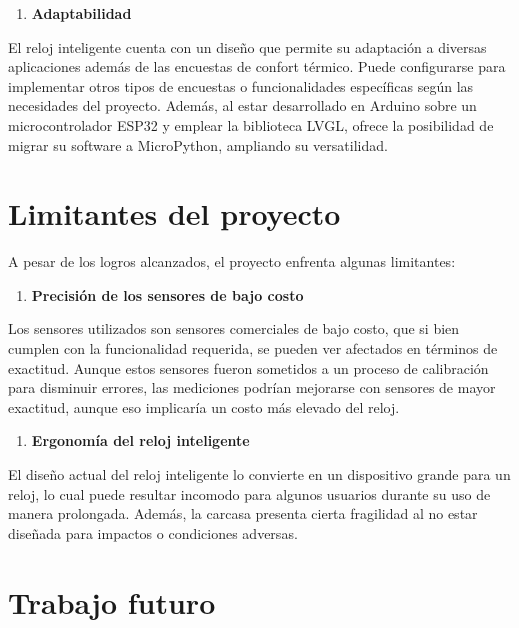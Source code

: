 \documentclass[
  12pt,
  letterpaper,
  DIV=11,
  numbers=noendperiod]{scrreport}
\providecommand{\tightlist}{%
  \setlength{\itemsep}{0pt}\setlength{\parskip}{0pt}}\usepackage{longtable,booktabs,array}
\begin{document}
\begin{enumerate}
\def\labelenumi{\arabic{enumi}.}
\setcounter{enumi}{3}
\tightlist
\item
  \textbf{Adaptabilidad}
\end{enumerate}

El reloj inteligente cuenta con un diseño que permite su adaptación a
diversas aplicaciones además de las encuestas de confort térmico. Puede
configurarse para implementar otros tipos de encuestas o funcionalidades
específicas según las necesidades del proyecto. Además, al estar
desarrollado en Arduino sobre un microcontrolador ESP32 y emplear la
biblioteca LVGL, ofrece la posibilidad de migrar su software a
MicroPython, ampliando su versatilidad.

\hypertarget{limitantes-del-proyecto}{%
\section{Limitantes del proyecto}\label{limitantes-del-proyecto}}

A pesar de los logros alcanzados, el proyecto enfrenta algunas
limitantes:

\begin{enumerate}
\def\labelenumi{\arabic{enumi}.}
\tightlist
\item
  \textbf{Precisión de los sensores de bajo costo}
\end{enumerate}

Los sensores utilizados son sensores comerciales de bajo costo, que si
bien cumplen con la funcionalidad requerida, se pueden ver afectados en
términos de exactitud. Aunque estos sensores fueron sometidos a un
proceso de calibración para disminuir errores, las mediciones podrían
mejorarse con sensores de mayor exactitud, aunque eso implicaría un
costo más elevado del reloj.

\begin{enumerate}
\def\labelenumi{\arabic{enumi}.}
\setcounter{enumi}{1}
\tightlist
\item
  \textbf{Ergonomía del reloj inteligente}
\end{enumerate}

El diseño actual del reloj inteligente lo convierte en un dispositivo
grande para un reloj, lo cual puede resultar incomodo para algunos
usuarios durante su uso de manera prolongada. Además, la carcasa
presenta cierta fragilidad al no estar diseñada para impactos o
condiciones adversas.

\hypertarget{trabajo-futuro}{%
\section{Trabajo futuro}\label{trabajo-futuro}}
\end{document}
